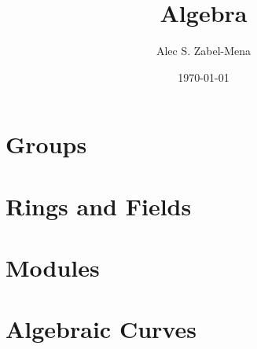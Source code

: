 \documentclass[12pt, twoside]{book}
\title{Algebra}
\author{Alec S. Zabel-Mena}
\date{\today}
\begin{document}
\maketitle
\tableofcontents
\newpage

\part{Groups}






\part{Rings and Fields}








%

\part{Modules}




\part{Algebraic Curves}



\nocite{*}



\end{document}
